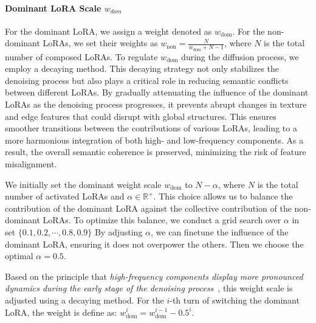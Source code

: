 \paragraph{Dominant LoRA Scale $w_{dom}$}
For the dominant LoRA, we assign a weight denoted as $w_{\text{dom}}$. For the non-dominant LoRAs, we set their weights as $w_{\text{non}} = \frac{N}{w_{\text{dom}} + N - 1}$, where $N$ is the total number of composed LoRAs. To regulate $w_{\text{dom}}$ during the diffusion process, we employ a decaying method. This decaying strategy not only stabilizes the denoising process but also plays a critical role in reducing semantic conflicts between different LoRAs. By gradually attenuating the influence of the dominant LoRAs as the denoising process progresses, it prevents abrupt changes in texture and edge features that could disrupt with global structures. This ensures smoother transitions between the contributions of various LoRAs, leading to a more harmonious integration of both high- and low-frequency components. As a result, the overall semantic coherence is preserved, minimizing the risk of feature misalignment.

We initially set the dominant weight scale $w_{\text{dom}}$ to $N-\alpha$, where $N$ is the total number of activated LoRAs and $\alpha\in\mathbb{R}^{+}$. This choice allows us to balance the contribution of the dominant LoRA against the collective contribution of the non-dominant LoRAs. To optimize this balance, we conduct a grid search over $\alpha$ in set $\{0.1,0.2,\cdots,0.8,0.9\}$ By adjusting $\alpha$, we can finetune the influence of the dominant LoRA, ensuring it does not overpower the others. Then we choose the optimal $\alpha=0.5$.

Based on the principle that \textit{high-frequency components display more pronounced dynamics during the early stage of the denoising process}~\citep{freeu}, this weight scale is adjusted using a decaying method. For the $i$-th turn of switching the dominant LoRA, the weight is define as: $w^{i}_{\text{dom}}=w^{i-1}_{\text{dom}}-0.5^{i}$.

